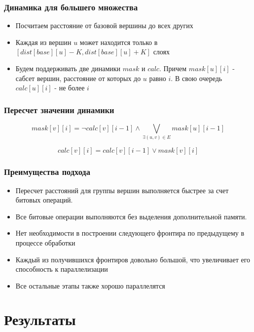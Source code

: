 \documentclass[10pt, compress]{beamer}
\begin{document}
\begin{frame}[fragile]
  \frametitle{Динамика для большего множества}
    \begin{itemize}
    	\item Посчитаем расстояние от базовой вершины до всех других
    	\item Каждая из вершин $u$ может находится только в $[dist[base][u]-K, dist[base][u]+K]$ слоях
		\item Будем поддерживать две динамики $mask$ и $calc$. Причем $mask[u][i]$ - сабсет вершин, расстояние от которых до $u$ равно $i$. В свою очередь $calc[u][i]$ - не более $i$
	\end{itemize}
\end{frame}

\begin{frame}[fragile]
  \frametitle{Пересчет значении динамики}
\begin{equation}
mask[v][i] = \neg calc[v][i - 1] \wedge \bigvee_{\exists (u, v) \in E} mask[u][i - 1] 
\end{equation}

\begin{equation}
calc[v][i] = calc[v][i - 1] \vee mask[v][i]
\end{equation}

\end{frame}

\begin{frame}[fragile]
  \frametitle{Преимущества подхода}
\begin{itemize}
  \item Пересчет расстояний для группы вершин выполняется быстрее за счет битовых операций.   
  \item Все битовые операции выполняются без выделения дополнительной памяти. 
  \item Нет необходимости в построении следующего фронтира по предыдущему в процессе обработки
  \item Каждый из получившихся фронтиров довольно большой, что увеличивает его способность к параллелизации
  \item Все остальные этапы также хорошо параллелятся
\end{itemize}

\end{frame}


\section{Результаты}
\end{document}
